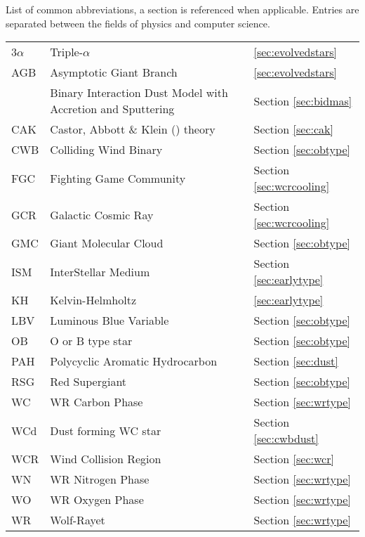 \begin{abbreviations}
List of common abbreviations, a section is referenced when applicable. Entries are separated between the fields of physics and computer science.

\begin{table}[h]
  \centering
  \begin{tabular}{lll}
    
    \hline

    3$\alpha$ & Triple-$\alpha$ & \ref{sec:evolvedstars} \\
    AGB & Asymptotic Giant Branch & \ref{sec:evolvedstars} \\
    \bidmas{} & Binary Interaction Dust Model with Accretion and Sputtering & Section \ref{sec:bidmas} \\
    CAK & Castor, Abbott \& Klein (\citeyear{castor_radiation-driven_1975}) theory & Section \ref{sec:cak} \\
    CWB & Colliding Wind Binary  & Section \ref{sec:obtype} \\
    FGC & Fighting Game Community & Section \ref{sec:wcrcooling} \\
    GCR & Galactic Cosmic Ray & Section \ref{sec:wcrcooling} \\
    GMC & Giant Molecular Cloud & Section \ref{sec:obtype}\\
    ISM & InterStellar Medium & Section \ref{sec:earlytype} \\
    KH  & Kelvin-Helmholtz & \ref{sec:earlytype} \\ 
    LBV & Luminous Blue Variable & Section \ref{sec:obtype} \\
    OB  & O or B type star & Section \ref{sec:obtype} \\ 
    PAH & Polycyclic Aromatic Hydrocarbon & Section \ref{sec:dust} \\
    RSG & Red Supergiant & Section \ref{sec:obtype} \\
    WC  & WR Carbon Phase & Section \ref{sec:wrtype} \\
    WCd & Dust forming WC star & Section \ref{sec:cwbdust} \\
    WCR & Wind Collision Region & Section \ref{sec:wcr} \\
    WN  & WR Nitrogen Phase & Section \ref{sec:wrtype} \\
    WO  & WR Oxygen Phase & Section \ref{sec:wrtype} \\
    WR  & Wolf-Rayet & Section \ref{sec:wrtype} \\


\end{tabular}
\end{table}
\end{abbreviations}
